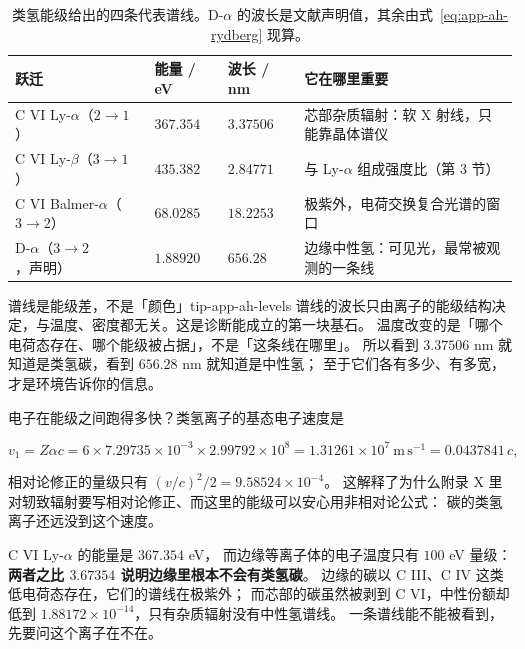 \begin{table}[htbp]
\centering
\small
\caption{类氢能级给出的四条代表谱线。D-$\alpha$ 的波长是文献声明值，其余由式~\eqref{eq:app-ah-rydberg} 现算。}
\label{tab:app-ah-levels}
\begin{tabular}{p{2.3cm}p{2.2cm}p{2.4cm}p{5.2cm}}
\toprule
跃迁 & 能量 / eV & 波长 / nm & 它在哪里重要 \\
\midrule
C VI Ly-$\alpha$（$2\to1$） & $367.354$ & $3.37506$ & 芯部杂质辐射：软 X 射线，只能靠晶体谱仪 \\
C VI Ly-$\beta$（$3\to1$） & $435.382$ & $2.84771$ & 与 Ly-$\alpha$ 组成强度比（第 3 节） \\
C VI Balmer-$\alpha$（$3\to2$） & $68.0285$ & $18.2253$ & 极紫外，电荷交换复合光谱的窗口 \\
D-$\alpha$（$3\to2$，声明） & $1.88920$ & $656.28$ & 边缘中性氢：可见光，最常被观测的一条线 \\
\bottomrule
\end{tabular}

\end{table}

\begin{tip}{谱线是能级差，不是「颜色」}{tip-app-ah-levels}
谱线的波长只由离子的能级结构决定，与温度、密度都无关。这是诊断能成立的第一块基石。
温度改变的是「哪个电荷态存在、哪个能级被占据」，不是「这条线在哪里」。
所以看到 $3.37506$ nm 就知道是类氢碳，看到 $656.28$ nm 就知道是中性氢；
至于它们各有多少、有多宽，才是环境告诉你的信息。
\end{tip}

电子在能级之间跑得多快？类氢离子的基态电子速度是

\begin{equation}
v_1 = Z\alpha c = 6\times7.29735\times10^{-3}\times2.99792\times10^{8}
    = 1.31261\times10^{7}\ \mathrm{m\,s^{-1}} = 0.0437841\,c,
\label{eq:app-ah-bohr}
\end{equation}

相对论修正的量级只有 $(v/c)^2/2 = 9.58524\times10^{-4}$。
这解释了为什么附录 X 里对轫致辐射要写相对论修正、而这里的能级可以安心用非相对论公式：
碳的类氢离子还远没到这个速度。

C VI Ly-$\alpha$ 的能量是 $367.354$ eV，
而边缘等离子体的电子温度只有 $100$ eV 量级：\textbf{两者之比 $3.67354$ 说明边缘里根本不会有类氢碳}。
边缘的碳以 C III、C IV 这类低电荷态存在，它们的谱线在极紫外；
而芯部的碳虽然被剥到 C VI，中性份额却低到 $1.88172\times10^{-14}$，只有杂质辐射没有中性氢谱线。
一条谱线能不能被看到，先要问这个离子在不在。

